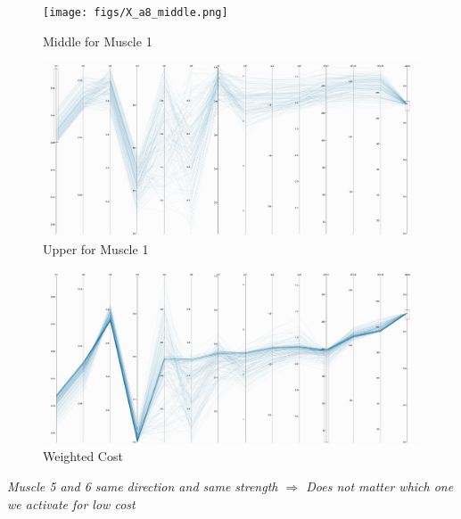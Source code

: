 \begin{figure}[ht]
   \begin{center}
    \texttt{[image: figs/X\_a8\_middle.png]}
  \end{center}
  \caption{Middle for Muscle 1}
  \label{fig_mid}
\end{figure}

\begin{figure}[ht]
   \begin{center}
    \includegraphics[width=1.0\textwidth]{figs/X_a8_upper.png}
  \end{center}
  \caption{Upper for Muscle 1}
  \label{fig_high}
\end{figure}

\begin{figure}[ht]
   \begin{center}
    \includegraphics[width=1.0\textwidth]{figs/X_a8_weightedcost.png}
  \end{center}
  \caption{Weighted Cost}
  \label{fig_cost}
\end{figure}

\textit{Muscle 5 and 6 same direction and same strength $\Rightarrow$ Does not matter which one we activate for low cost}
